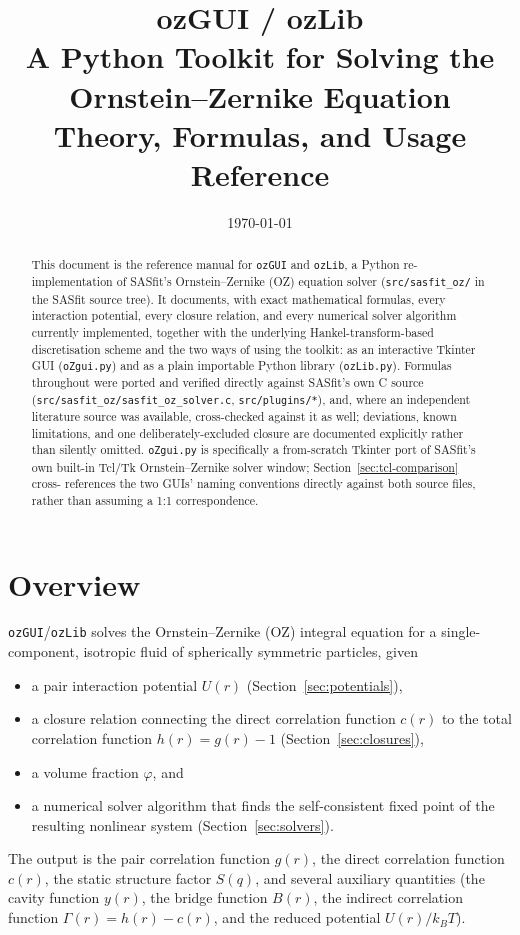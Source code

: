 \documentclass[11pt,a4paper]{article}
\title{\textbf{ozGUI / ozLib}\\[0.3cm]
\large A Python Toolkit for Solving the Ornstein--Zernike Equation\\[0.2cm]
\normalsize Theory, Formulas, and Usage Reference}
\author{}
\date{\today}
\newcommand{\code}[1]{\texttt{#1}}
\begin{document}
\maketitle
\thispagestyle{empty}

\begin{abstract}
\noindent
This document is the reference manual for \code{ozGUI} and \code{ozLib}, a Python
re-implementation of SASfit's Ornstein--Zernike (OZ) equation solver
(\code{src/sasfit\_oz/} in the SASfit source tree). It documents, with exact
mathematical formulas, every interaction potential, every closure relation, and
every numerical solver algorithm currently implemented, together with the
underlying Hankel-transform-based discretisation scheme and the two ways of
using the toolkit: as an interactive Tkinter GUI (\code{oZgui.py}) and as a plain
importable Python library (\code{ozLib.py}). Formulas throughout were ported and
verified directly against SASfit's own C source
(\code{src/sasfit\_oz/sasfit\_oz\_solver.c}, \code{src/plugins/*}), and, where an
independent literature source was available, cross-checked against it as well;
deviations, known limitations, and one deliberately-excluded closure are
documented explicitly rather than silently omitted. \code{oZgui.py} is
specifically a from-scratch Tkinter port of SASfit's own built-in Tcl/Tk
Ornstein--Zernike solver window; Section~\ref{sec:tcl-comparison} cross-
references the two GUIs' naming conventions directly against both source
files, rather than assuming a 1:1 correspondence.
\end{abstract}

\tableofcontents
\clearpage

\section{Overview}

\code{ozGUI}/\code{ozLib} solves the Ornstein--Zernike (OZ) integral equation for a
single-component, isotropic fluid of spherically symmetric particles, given
\begin{itemize}[nosep]
  \item a pair interaction potential $U(r)$ (Section~\ref{sec:potentials}),
  \item a closure relation connecting the direct correlation function $c(r)$ to
        the total correlation function $h(r)=g(r)-1$ (Section~\ref{sec:closures}),
  \item a volume fraction $\varphi$, and
  \item a numerical solver algorithm that finds the self-consistent fixed point
        of the resulting nonlinear system (Section~\ref{sec:solvers}).
\end{itemize}
The output is the pair correlation function $g(r)$, the direct correlation
function $c(r)$, the static structure factor $S(q)$, and several auxiliary
quantities (the cavity function $y(r)$, the bridge function $B(r)$, the
indirect correlation function $\Gamma(r)=h(r)-c(r)$, and the reduced potential
$U(r)/k_BT$).
\end{document}
